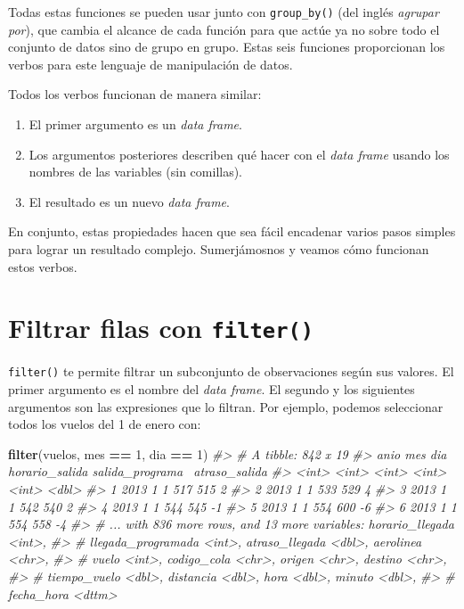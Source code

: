 \documentclass[11pt,oneside]{report}
\newenvironment{Shaded}{\begin{snugshade}}{\end{snugshade}}
\newcommand{\CommentTok}[1]{\textcolor[rgb]{0.56,0.35,0.01}{\textit{#1}}}
\newcommand{\DecValTok}[1]{\textcolor[rgb]{0.00,0.00,0.81}{#1}}
\newcommand{\KeywordTok}[1]{\textcolor[rgb]{0.13,0.29,0.53}{\textbf{#1}}}
\newcommand{\NormalTok}[1]{#1}
\newcommand{\OperatorTok}[1]{\textcolor[rgb]{0.81,0.36,0.00}{\textbf{#1}}}
\newcommand{\StringTok}[1]{\textcolor[rgb]{0.31,0.60,0.02}{#1}}
\begin{document}
Todas estas funciones se pueden usar junto con \texttt{group\_by()} (del
inglés \emph{agrupar por}), que cambia el alcance de cada función para
que actúe ya no sobre todo el conjunto de datos sino de grupo en grupo.
Estas seis funciones proporcionan los verbos para este lenguaje de
manipulación de datos.

Todos los verbos funcionan de manera similar:

\begin{enumerate}
\def\labelenumi{\arabic{enumi}.}
\item
  El primer argumento es un \emph{data frame}.
\item
  Los argumentos posteriores describen qué hacer con el \emph{data
  frame} usando los nombres de las variables (sin comillas).
\item
  El resultado es un nuevo \emph{data frame}.
\end{enumerate}

En conjunto, estas propiedades hacen que sea fácil encadenar varios
pasos simples para lograr un resultado complejo. Sumerjámosnos y veamos
cómo funcionan estos verbos.

\hypertarget{filtrar-filas-con-filter}{%
\section{\texorpdfstring{Filtrar filas con
\texttt{filter()}}{Filtrar filas con filter()}}\label{filtrar-filas-con-filter}}

\texttt{filter()} te permite filtrar un subconjunto de observaciones
según sus valores. El primer argumento es el nombre del \emph{data
frame}. El segundo y los siguientes argumentos son las expresiones que
lo filtran. Por ejemplo, podemos seleccionar todos los vuelos del 1 de
enero con:

\begin{Shaded}
\begin{Highlighting}[]
\KeywordTok{filter}\NormalTok{(vuelos, mes }\OperatorTok{==}\StringTok{ }\DecValTok{1}\NormalTok{, dia }\OperatorTok{==}\StringTok{ }\DecValTok{1}\NormalTok{)}
\CommentTok{#> # A tibble: 842 x 19}
\CommentTok{#>    anio   mes   dia horario_salida salida_programa~ atraso_salida}
\CommentTok{#>   <int> <int> <int>          <int>            <int>         <dbl>}
\CommentTok{#> 1  2013     1     1            517              515             2}
\CommentTok{#> 2  2013     1     1            533              529             4}
\CommentTok{#> 3  2013     1     1            542              540             2}
\CommentTok{#> 4  2013     1     1            544              545            -1}
\CommentTok{#> 5  2013     1     1            554              600            -6}
\CommentTok{#> 6  2013     1     1            554              558            -4}
\CommentTok{#> # ... with 836 more rows, and 13 more variables: horario_llegada <int>,}
\CommentTok{#> #   llegada_programada <int>, atraso_llegada <dbl>, aerolinea <chr>,}
\CommentTok{#> #   vuelo <int>, codigo_cola <chr>, origen <chr>, destino <chr>,}
\CommentTok{#> #   tiempo_vuelo <dbl>, distancia <dbl>, hora <dbl>, minuto <dbl>,}
\CommentTok{#> #   fecha_hora <dttm>}
\end{Highlighting}
\end{Shaded}
\end{document}
